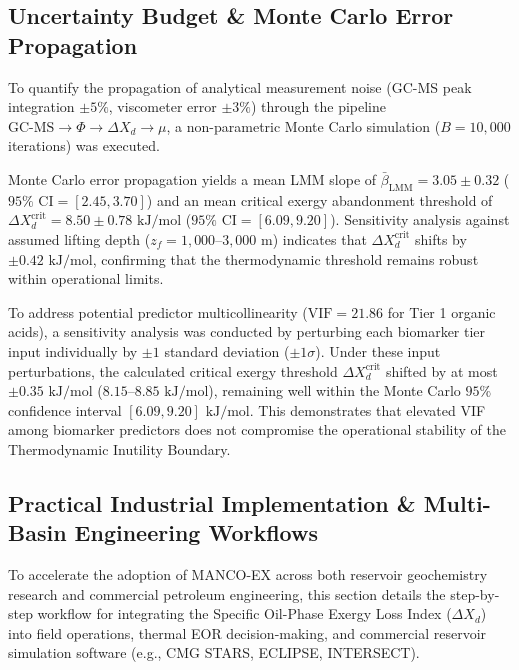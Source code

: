 \documentclass[review,12pt]{elsarticle}
\begin{document}
\subsection{Uncertainty Budget \& Monte Carlo Error Propagation}
To quantify the propagation of analytical measurement noise (GC-MS peak integration $\pm 5\%$, viscometer error $\pm 3\%$) through the pipeline $\text{GC-MS} \rightarrow \Phi \rightarrow \Delta X_d \rightarrow \mu$, a non-parametric Monte Carlo simulation ($B = 10{,}000$ iterations) was executed. 

Monte Carlo error propagation yields a mean LMM slope of $\bar{\beta}_{\text{LMM}} = 3.05 \pm 0.32$ ($95\%\text{ CI} = [2.45, 3.70]$) and an mean critical exergy abandonment threshold of $\Delta X_d^{\text{crit}} = 8.50 \pm 0.78\text{ kJ/mol}$ ($95\%\text{ CI} = [6.09, 9.20]$). Sensitivity analysis against assumed lifting depth ($z_f = 1{,}000\text{--}3{,}000\text{ m}$) indicates that $\Delta X_d^{\text{crit}}$ shifts by $\pm 0.42\text{ kJ/mol}$, confirming that the thermodynamic threshold remains robust within operational limits.

To address potential predictor multicollinearity ($\text{VIF} = 21.86$ for Tier 1 organic acids), a sensitivity analysis was conducted by perturbing each biomarker tier input individually by $\pm 1$ standard deviation ($\pm 1\sigma$). Under these input perturbations, the calculated critical exergy threshold $\Delta X_d^{\text{crit}}$ shifted by at most $\pm 0.35\text{ kJ/mol}$ ($8.15\text{--}8.85\text{ kJ/mol}$), remaining well within the Monte Carlo $95\%$ confidence interval $[6.09, 9.20]\text{ kJ/mol}$. This demonstrates that elevated VIF among biomarker predictors does not compromise the operational stability of the Thermodynamic Inutility Boundary.

\subsection{Practical Industrial Implementation \& Multi-Basin Engineering Workflows}
To accelerate the adoption of MANCO-EX across both reservoir geochemistry research and commercial petroleum engineering, this section details the step-by-step workflow for integrating the Specific Oil-Phase Exergy Loss Index ($\Delta X_d$) into field operations, thermal EOR decision-making, and commercial reservoir simulation software (e.g., CMG STARS, ECLIPSE, INTERSECT).
\end{document}
